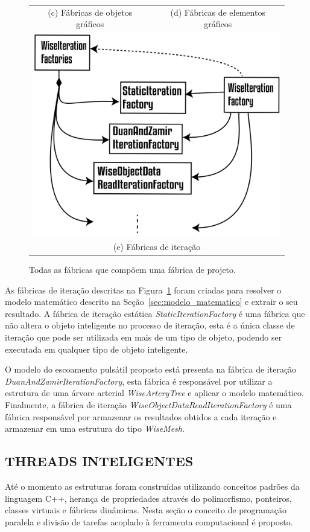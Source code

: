 \begin{figure}
\begin{tabular}{cc}
		(c) Fábricas de objetos gráficos & (d) Fábricas de elementos gráficos \\[6pt]
		\multicolumn{2}{c}{\includegraphics[width=0.5\linewidth]{Figures/WiseIterationFactories@16x.png} }\\
		\multicolumn{2}{c}{(e) Fábricas de iteração}
	\end{tabular}
	\caption{Todas as fábricas que compõem uma fábrica de projeto.}
	\label{tab:factories} 
\end{figure}

 As fábricas de iteração descritas na Figura~\ref{tab:factories} foram criadas para resolver o modelo matemático descrito na Seção~\ref{sec:modelo_matematico} e extrair o seu resultado. A fábrica de iteração estática \textit{StaticIterationFactory} é uma fábrica que não altera o objeto inteligente no processo de iteração, esta é a única classe de iteração que pode ser utilizada em mais de um tipo de objeto, podendo ser executada em qualquer tipo de objeto inteligente.

O modelo do escoamento pulsátil proposto está presenta na fábrica de iteração \textit{DuanAndZamirIterationFactory}, esta fábrica é responsável por utilizar a estrutura de uma árvore arterial \textit{WiseArteryTree} e aplicar o modelo matemático. Finalmente, a fábrica de iteração \textit{WiseObjectDataReadIterationFactory} é uma fábrica responsável por armazenar os resultados obtidos a cada iteração e armazenar em uma estrutura do tipo \textit{WiseMesh}.

\subsection{THREADS INTELIGENTES}\label{sec:threads}

Até o momento as estruturas foram construídas utilizando conceitos padrões da linguagem C++, herança de propriedades através do polimorfismo, ponteiros, classes virtuais e fábricas dinâmicas. Nesta seção o conceito de programação paralela e divisão de tarefas acoplado à ferramenta computacional é proposto.

